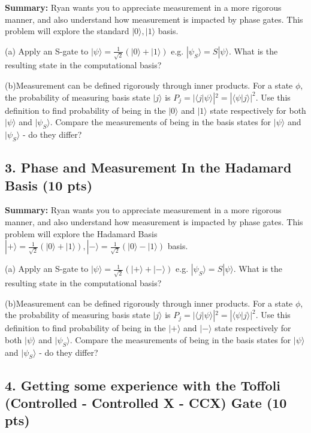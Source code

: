 \documentclass[12pt]{article}
\newcommand{\ket}[1]{| #1 \rangle}
\begin{document}
\textbf{Summary:} Ryan wants you to appreciate measurement in a more rigorous manner, and also understand how measurement is impacted by phase gates. This problem will explore the standard $\ket{0}, \ket{1} $ basis. 

(a) Apply an S-gate to $\ket{\psi} = \frac{1}{\sqrt{2}}( \ket{0} + \ket{1})$ e.g. $\ket{\psi_S} = S \ket{\psi}$. What is the resulting state in the computational basis?

(b)Measurement can be defined rigorously through inner products. For a state $\phi$, the probability of measuring basis state $\ket{j}$ is $P_j = |\langle j | \psi \rangle|^2 =   |\langle \psi | j \rangle|^2$. Use this definition to find probability of being in the $\ket{0}$ and $\ket{1}$ state respectively for both $\ket{\psi}$ and $\ket{\psi_S}$. Compare the measurements of being in the basis states for $\ket{\psi}$ and $\ket{\psi_S}$ - do they differ?

\subsection*{3. Phase and Measurement In the Hadamard Basis (10 pts)}

\textbf{Summary:} Ryan wants you to appreciate measurement in a more rigorous manner, and also understand how measurement is impacted by phase gates. This problem will explore the Hadamard Basis $\ket{+} = \frac{1}{\sqrt{2}} ( \ket{0} + \ket{1}) , \ket{-} =  \frac{1}{\sqrt{2}} ( \ket{0} - \ket{1}) $ basis.

(a) Apply an S-gate to $\ket{\psi} = \frac{1}{\sqrt{2}}( \ket{+} + \ket{-})$ e.g. $\ket{\psi_S} = S \ket{\psi}$. What is the resulting state in the computational basis?

(b)Measurement can be defined rigorously through inner products. For a state $\phi$, the probability of measuring basis state $\ket{j}$ is $P_j = |\langle j | \psi \rangle|^2 =   |\langle \psi | j \rangle|^2$. Use this definition to find probability of being in the $\ket{+}$ and $\ket{-}$ state respectively for both $\ket{\psi}$ and $\ket{\psi_S}$. Compare the measurements of being in the basis states for $\ket{\psi}$ and $\ket{\psi_S}$ - do they differ?

\subsection*{4. Getting some experience with the Toffoli (Controlled - Controlled X  - CCX) Gate (10 pts)}
\end{document}

